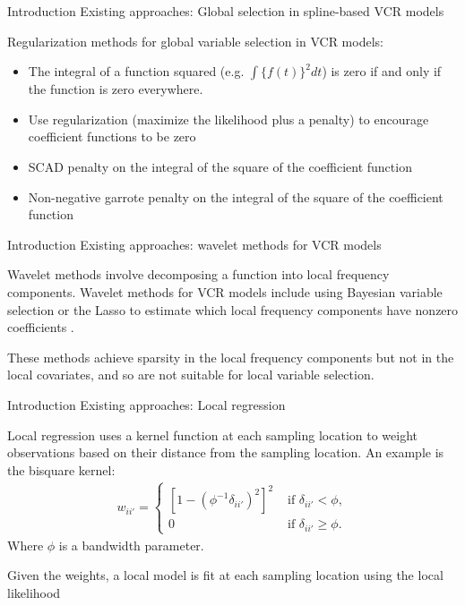\documentclass[12pt,t]{beamer}
\newcommand{\subt}[1]{{\footnotesize \color{subtitle} {#1}}}
\begin{document}
\begin{frame}{Introduction}
\subt{Existing approaches: Global selection in spline-based VCR models}

\bigskip
Regularization methods for global variable selection in VCR models:
\begin{itemize}
    \item The integral of a function squared (e.g. $\int \{f(t)\}^2 dt$) is zero if and only if the function is zero everywhere.
    \item Use regularization (maximize the likelihood plus a penalty) to encourage coefficient functions to be zero
    \item SCAD penalty \citep{Fan:2001} on the integral of the square of the coefficient function \citep{Wang:2008a}
    \item Non-negative garrote penalty \citep{Breiman:1995} on the integral of the square of the coefficient function \citep{Antoniadis:2012b}
\end{itemize}

\end{frame}




\begin{frame}{Introduction}
\subt{Existing approaches: wavelet methods for VCR models}

\bigskip
Wavelet methods involve decomposing a function into local frequency components. Wavelet methods for VCR models include using Bayesian variable selection or the Lasso to estimate which local frequency components have nonzero coefficients \citep{Shang-2011,Zhang-2011}.

\vspace{10mm}

These methods achieve sparsity in the local frequency components but not in the local covariates, and so are not suitable for local variable selection.

\note{}
\end{frame}




\begin{frame}{Introduction}
\subt{Existing approaches: Local regression}

\bigskip
Local regression uses a kernel function at each sampling location to weight observations based on their distance from the sampling location. An example is the bisquare kernel:
\begin{align}
	w_{ii'} = \begin{cases} \left[1-\left(\phi^{-1}\delta_{ii'}\right)^2\right]^2 &\mbox{ if } \delta_{ii'} < \phi, \\ 0 &\mbox{ if } \delta_{ii'} \geq \phi. \end{cases}
\end{align}
Where $\phi$ is a bandwidth parameter.

Given the weights, a local model is fit at each sampling location using the local likelihood \citep{Loader:1999}

\note{}
\end{frame}
\end{document}

